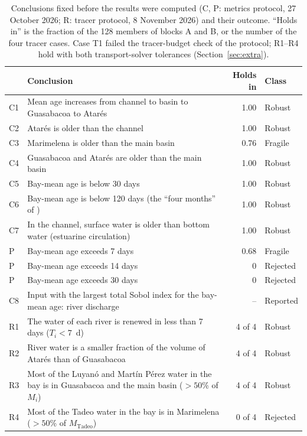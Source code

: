 \documentclass[a4paper,fleqn]{ems-dc}
\begin{document}
\begin{table}[!t]
\centering\small
\caption{Conclusions fixed before the results were computed (C, P: metrics protocol,
27 October 2026; R: tracer protocol, 8 November 2026) and their outcome. ``Holds in'' is the
fraction of the 128 members of blocks A and B, or the number of the four tracer
cases. Case T1 failed the tracer-budget check of the protocol; R1--R4 hold with both
transport-solver tolerances (Section~\ref{sec:extra}).}\label{tab:concl}
\begin{tabular}{lp{11.2cm}rl}
\toprule
& Conclusion & Holds in & Class\\
\midrule
C1 & Mean age increases from channel to basin to Guasabacoa to Atar\'es & 1.00 & Robust\\
C2 & Atar\'es is older than the channel & 1.00 & Robust\\
C3 & Marimelena is older than the main basin & 0.76 & Fragile\\
C4 & Guasabacoa and Atar\'es are older than the main basin & 1.00 & Robust\\
C5 & Bay-mean age is below 30 days & 1.00 & Robust\\
C6 & Bay-mean age is below 120 days (the ``four months'' of \citealt{JICA2004}) & 1.00 & Robust\\
C7 & In the channel, surface water is older than bottom water (estuarine circulation) & 1.00 & Robust\\
P & Bay-mean age exceeds 7 days & 0.68 & Fragile\\
P & Bay-mean age exceeds 14 days & 0 & Rejected\\
P & Bay-mean age exceeds 30 days & 0 & Rejected\\
C8 & Input with the largest total Sobol index for the bay-mean age: river discharge & -- & Reported\\
\midrule
R1 & The water of each river is renewed in less than 7 days ($T_i < 7$~d) & 4 of 4 & Robust\\
R2 & River water is a smaller fraction of the volume of Atar\'es than of Guasabacoa & 4 of 4 & Robust\\
R3 & Most of the Luyan\'o and Mart\'in P\'erez water in the bay is in Guasabacoa and the main
basin ($>50$\% of $M_i$) & 4 of 4 & Robust\\
R4 & Most of the Tadeo water in the bay is in Marimelena ($>50$\% of $M_\mathrm{Tadeo}$) & 0 of 4 & Rejected\\
\bottomrule
\end{tabular}
\end{table}
\end{document}
